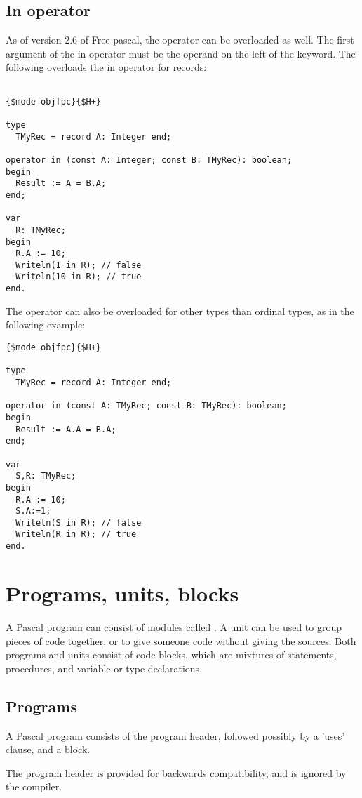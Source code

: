 \section{In operator}
As of version 2.6 of Free pascal, the  operator can be overloaded as well.
The first argument of the in operator must be the operand on the left of the
 keyword.
The following overloads the in operator for records:
\begin{verbatim}

{$mode objfpc}{$H+}

type
  TMyRec = record A: Integer end;

operator in (const A: Integer; const B: TMyRec): boolean;
begin
  Result := A = B.A;
end;

var
  R: TMyRec;
begin
  R.A := 10;
  Writeln(1 in R); // false
  Writeln(10 in R); // true
end.
\end{verbatim}
The  operator can also be overloaded for other types than ordinal
types, as in the following example:
\begin{verbatim}
{$mode objfpc}{$H+}

type
  TMyRec = record A: Integer end;

operator in (const A: TMyRec; const B: TMyRec): boolean;
begin
  Result := A.A = B.A;
end;

var 
  S,R: TMyRec;
begin
  R.A := 10;
  S.A:=1;
  Writeln(S in R); // false
  Writeln(R in R); // true
end.
\end{verbatim}


\chapter{Programs, units, blocks}
A Pascal program can consist of modules called . A unit can be used
to group pieces of code together, or to give someone code without giving
the sources.
Both programs and units consist of code blocks, which are mixtures of
statements, procedures, and variable or type declarations.

\section{Programs}
A Pascal program consists of the program header, followed possibly by a
'uses' clause, and a block.

The program header is provided for backwards compatibility, and is ignored
by the compiler.

